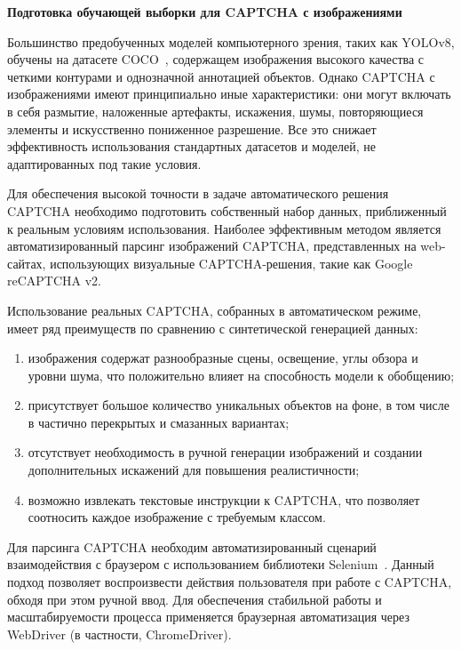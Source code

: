 \vspace{-0.7cm}

\textbf{Подготовка обучающей выборки для CAPTCHA с изображениями}

Большинство предобученных моделей компьютерного зрения, таких как YOLOv8, обучены 
на датасете COCO~\cite{COCO}, содержащем изображения высокого качества с четкими 
контурами и однозначной аннотацией объектов. Однако CAPTCHA с изображениями имеют 
принципиально иные характеристики: они могут включать в себя размытие, наложенные 
артефакты, искажения, шумы, повторяющиеся элементы и искусственно пониженное 
разрешение. Все это снижает эффективность использования стандартных датасетов и 
моделей, не адаптированных под такие условия.

Для обеспечения высокой точности в задаче автоматического решения CAPTCHA 
необходимо подготовить собственный набор данных, приближенный к реальным условиям 
использования. Наиболее эффективным методом является автоматизированный парсинг 
изображений CAPTCHA, представленных на web-сайтах, использующих визуальные 
CAPTCHA-решения, такие как Google reCAPTCHA v2.

Использование реальных CAPTCHA, собранных в автоматическом режиме, имеет ряд 
преимуществ по сравнению с синтетической генерацией данных:

\begin{enumerate}
    \item изображения содержат разнообразные сцены, освещение, углы обзора и 
    уровни шума, что положительно влияет на способность модели к обобщению;
    \item присутствует большое количество уникальных объектов на фоне, в том 
    числе в частично перекрытых и смазанных вариантах;
    \item отсутствует необходимость в ручной генерации изображений и создании 
    дополнительных искажений для повышения реалистичности;
    \item возможно извлекать текстовые инструкции к CAPTCHA, что позволяет 
    соотносить каждое изображение с требуемым классом.
\end{enumerate}

Для парсинга CAPTCHA необходим автоматизированный сценарий взаимодействия с 
браузером с использованием библиотеки Selenium~\cite{Selenium}. Данный подход 
позволяет воспроизвести действия пользователя при работе с CAPTCHA, обходя при 
этом ручной ввод. Для обеспечения стабильной работы и масштабируемости процесса 
применяется браузерная автоматизация через WebDriver (в частности, ChromeDriver).

